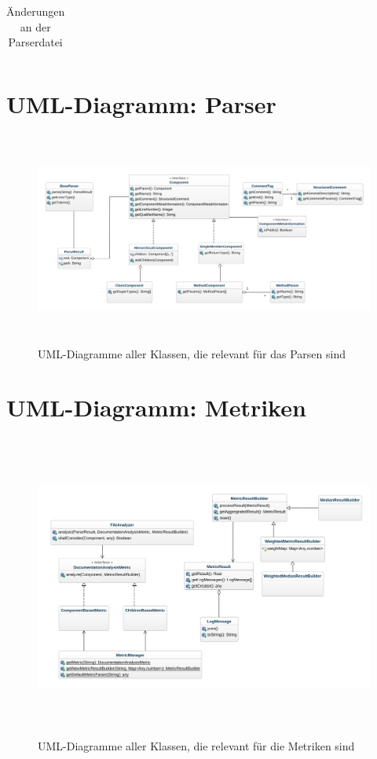 \begin{appendices}
\begin{table}[h!]
\begin{tabular}{m{0.75cm}|m{4cm}|m{10cm}}
    \end{tabular}
    \caption{Änderungen an der Parserdatei}
    \label{tab:parser_changes}
\end{table}

\chapter{UML-Diagramm: Parser}
\begin{figure}[ht!]
    \centering
    \includegraphics[height=7cm,keepaspectratio,angle=90]{figures/uml/parsing.png}
    \caption{UML-Diagramme aller Klassen, die relevant für das Parsen sind}
    \label{fig:uml_parsing}
\end{figure}
\chapter{UML-Diagramm: Metriken}
\begin{figure}[ht!]
    \centering
    \includegraphics[height=10cm,keepaspectratio,angle=90]{figures/uml/metriken.png}
    \caption{UML-Diagramme aller Klassen, die relevant für die Metriken sind}
    \label{fig:uml_metrics}
\end{figure}

\end{appendices}
